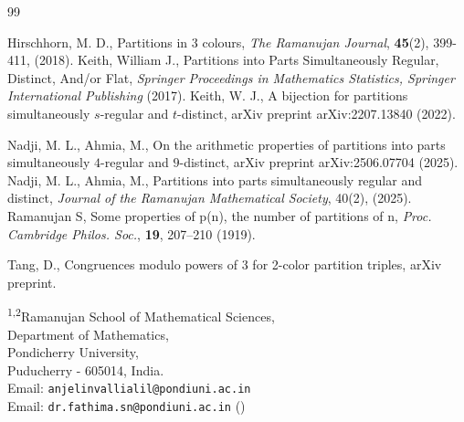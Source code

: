 \documentclass[11pt,a4paper]{article}
\numberwithin{equation}{section}
\theoremstyle{plain}
\begin{document}
	\begin{thebibliography}{99}

		Hirschhorn, M. D., Partitions in 3 colours, {\it The Ramanujan Journal}, \textbf{45}(2), 399-411, (2018).
		Keith, William J., Partitions into Parts Simultaneously Regular, Distinct, And/or Flat, {\it Springer Proceedings in Mathematics  Statistics, Springer International Publishing} (2017).
		Keith, W. J., A bijection for partitions simultaneously $ s $-regular and $ t $-distinct, arXiv preprint arXiv:2207.13840 (2022).

			Nadji, M. L., Ahmia, M., On the arithmetic properties of partitions into parts simultaneously $4 $-regular and $9 $-distinct, arXiv preprint arXiv:2506.07704 (2025).
			Nadji, M. L., Ahmia, M., Partitions into parts simultaneously regular and distinct, {\it Journal of the Ramanujan Mathematical Society}, {40}(2), (2025).
			Ramanujan S, Some properties of p(n), the number of partitions of n, {\it Proc. Cambridge Philos. Soc.}, \textbf{19}, 207–210 (1919).

		Tang, D., Congruences modulo powers of 3 for 2-color partition triples, arXiv preprint. 
	
		
	\end{thebibliography}
	\bigskip
	
	\bigskip
	
	\noindent\textsuperscript{1,2}Ramanujan School of Mathematical Sciences,\\Department of Mathematics,\\ Pondicherry University,\\ Puducherry - 605014, India. \\
	
	\noindent Email: \texttt{anjelinvallialil@pondiuni.ac.in} \\
	Email: \texttt{dr.fathima.sn@pondiuni.ac.in}  (\Letter)
\end{document}
